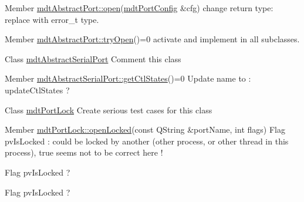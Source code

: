 \label{todo__todo000008}
\hypertarget{todo__todo000008}{}
 
\begin{DoxyDescription}
\item[Member \hyperlink{classmdt_abstract_port_a4a8195c2bf580eb69ad5d90de86798e6}{mdtAbstractPort::open}(\hyperlink{classmdt_port_config}{mdtPortConfig} \&cfg) ]change return type: replace with error\_\-t type.
\end{DoxyDescription}

\label{todo__todo000007}
\hypertarget{todo__todo000007}{}
 
\begin{DoxyDescription}
\item[Member \hyperlink{classmdt_abstract_port_a44d2d57b118d2b1f7a0041fcf84958ac}{mdtAbstractPort::tryOpen}()=0 ]activate and implement in all subclasses. 
\end{DoxyDescription}

\label{todo__todo000011}
\hypertarget{todo__todo000011}{}
 
\begin{DoxyDescription}
\item[Class \hyperlink{classmdt_abstract_serial_port}{mdtAbstractSerialPort} ]Comment this class 
\end{DoxyDescription}

\label{todo__todo000012}
\hypertarget{todo__todo000012}{}
 
\begin{DoxyDescription}
\item[Member \hyperlink{classmdt_abstract_serial_port_aaeacd26b220ab0f8c521cef74edfafdd}{mdtAbstractSerialPort::getCtlStates}()=0 ]Update name to : updateCtlStates ? 
\end{DoxyDescription}

\label{todo__todo000004}
\hypertarget{todo__todo000004}{}
 
\begin{DoxyDescription}
\item[Class \hyperlink{classmdt_port_lock}{mdtPortLock} ]Create serious test cases for this class 
\end{DoxyDescription}

\label{todo__todo000001}
\hypertarget{todo__todo000001}{}
 
\begin{DoxyDescription}
\item[Member \hyperlink{classmdt_port_lock_a25e9a2cb8a10069fae75c76b6809c27f}{mdtPortLock::openLocked}(const QString \&portName, int flags) ]Flag pvIsLocked : could be locked by another (other process, or other thread in this process), true seems not to be correct here ! 

Flag pvIsLocked ? 

Flag pvIsLocked ? 
\end{DoxyDescription}

